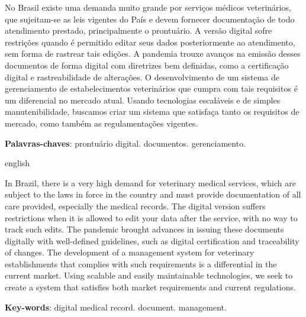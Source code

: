 \documentclass[
    12pt,               %
    openright,          %
    oneside,
    a4paper,            %
    BIBLATEX,           %
    TODO,               %
    english,            %
    brazil              %
    ]{ifsp-spo-inf-ctds}
\begin{document}
 
\frenchspacing 

\pretextual

\imprimircapa
\imprimirfolhaderosto






\setlength{\absparsep}{18pt} %
\begin{resumo}

No Brasil existe uma demanda muito grande por serviços médicos veterinários, que sujeitam-se as leis vigentes do País e devem fornecer documentação de todo atendimento prestado, principalmente o prontuário. A versão digital sofre restrições quando é permitido editar seus dados posteriormente ao atendimento, sem forma de rastrear tais edições. A pandemia trouxe avanços na emissão desses documentos de forma digital com diretrizes bem definidas, como a certificação digital e rastreabilidade de alterações. O desenvolvimento de um sistema de gerenciamento de estabelecimentos veterinários que cumpra com tais requisitos é um diferencial no mercado atual. Usando tecnologias escaláveis e de simples manutenibilidade, buscamos criar um sistema que satisfaça tanto os requisitos de mercado, como também as regulamentações vigentes. 

\textbf{Palavras-chaves}: prontuário digital. documentos. gerenciamento.
\end{resumo}

\begin{resumo}[Abstract]
 \begin{otherlanguage*}{english}
 
 In Brazil, there is a very high demand for veterinary medical services, which are subject to the laws in force in the country and must provide documentation of all care provided, especially the medical records. The digital version suffers restrictions when it is allowed to edit your data after the service, with no way to track such edits. The pandemic brought advances in issuing these documents digitally with well-defined guidelines, such as digital certification and traceability of changes. The development of a management system for veterinary establishments that complies with such requirements is a differential in the current market. Using scalable and easily maintainable technologies, we seek to create a system that satisfies both market requirements and current regulations.
 	
   \vspace{\onelineskip}
 
   \noindent 
   \textbf{Key-words}: digital medical record. document. management. 
 \end{otherlanguage*}
\end{resumo}
\end{document}
